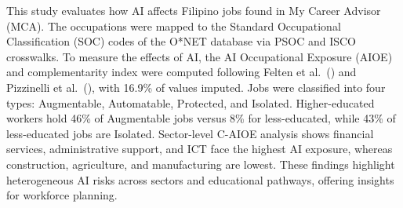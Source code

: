 This study evaluates how AI affects Filipino jobs found in My Career Advisor (MCA). The occupations were mapped to the Standard Occupational Classification (SOC) codes of the O*NET database via PSOC and ISCO crosswalks. 
To measure the effects of AI, the AI Occupational Exposure (AIOE) and complementarity index were computed following Felten et al.\ (\citeyear{felten2021}) and Pizzinelli et al.\ (\citeyear{Pizzinelli2023Labor}), with 16.9\% of values imputed. 
Jobs were classified into four types: Augmentable, Automatable, Protected, and Isolated. 
Higher-educated workers hold 46\% of Augmentable jobs versus 8\% for less-educated, while 43\% of less-educated jobs are Isolated. 
Sector-level C-AIOE analysis shows financial services, administrative support, and ICT face the highest AI exposure, whereas construction, agriculture, and manufacturing are lowest. 
These findings highlight heterogeneous AI risks across sectors and educational pathways, offering insights for workforce planning.
